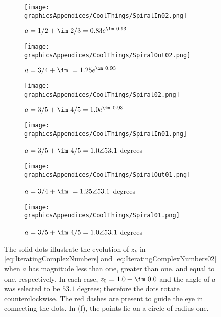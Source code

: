 \vspace*{0.2cm}


\begin{figure}
\centering
\begin{subfigure}{.32\textwidth}
  \centering
  \texttt{[image: graphicsAppendices/CoolThings/SpiralIn02.png]}
  \caption{$a = 1/2 + \im~2/3 = 0.83 e^{\im~ 0.93}$}
\end{subfigure}
\begin{subfigure}{.32\textwidth}
  \centering
  \texttt{[image: graphicsAppendices/CoolThings/SpiralOut02.png]}
  \caption{$a = 3/4 + \im~ = 1.25 e^{\im~ 0.93}$}
\end{subfigure}
\begin{subfigure}{.32\textwidth}
  \centering
  \texttt{[image: graphicsAppendices/CoolThings/Spiral02.png]}
  \caption{$a = 3/5 + \im~4/5 = 1.0  e^{\im~ 0.93}$}
\end{subfigure}

\begin{subfigure}{.32\textwidth}
  \centering
  \texttt{[image: graphicsAppendices/CoolThings/SpiralIn01.png]}
  \caption{$a = 3/5 + \im~4/5 = 1.0 \angle 53.1$ degrees}
\end{subfigure}
\begin{subfigure}{.32\textwidth}
  \centering
  \texttt{[image: graphicsAppendices/CoolThings/SpiralOut01.png]}
  \caption{$a = 3/4 + \im~ = 1.25 \angle 53.1$ degrees}
\end{subfigure}
\begin{subfigure}{.32\textwidth}
  \centering
  \texttt{[image: graphicsAppendices/CoolThings/Spiral01.png]}
  \caption{$a = 3/5 + \im~4/5 = 1.0   \angle 53.1$ degrees}
\end{subfigure}

\caption{The solid dots illustrate the evolution of $z_k$ in \eqref{eq:IteratingComplexNumbers} and \eqref{eq:IteratingComplexNumbers02} when $a$ has magnitude less than one, greater than one, and equal to one, respectively. In each case, $z_0 = 1.0 + \im~0.0$ and the angle of $a$ was selected to be $53.1$ degrees; therefore the dots rotate counterclockwise. The red dashes are present to guide the eye in connecting the dots. In (f), the points lie on a circle of radius one.}
\label{fig:comparison_magnitude_of_a}
\end{figure}

\vspace*{0.2cm}

